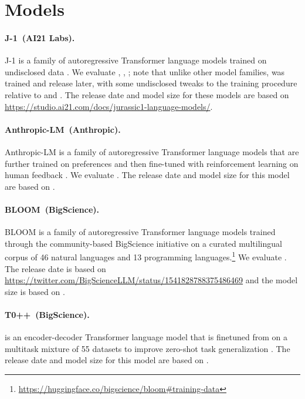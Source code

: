 \section{Models}
\label{app:models}

\paragraph{J-1~(AI21 Labs).} 
J-1 is a family of autoregressive Transformer language models trained on undisclosed data \citep{lieber2021jurassic}. 
We evaluate \jurassiclarge, \jurassicgrande, \jurassicjumbo; note that unlike other model families, \jurassicgrande was trained and release later, with some undisclosed tweaks to the training procedure relative to \jurassiclarge and \jurassicgrande.
The release date and model size for these models are based on \url{https://studio.ai21.com/docs/jurassic1-language-models/}.

\paragraph{Anthropic-LM~(Anthropic).}
Anthropic-LM  is a family of autoregressive Transformer language models \citep{askell2021general} that are further trained on preferences and then fine-tuned with reinforcement learning on human feedback \citep{bai2022helpful}.
We evaluate \anthropic.
The release date and model size for this model are based on \citet{bai2022helpful}.

\paragraph{BLOOM~(BigScience).}
BLOOM \citep{scao2022bloom} is a family of autoregressive Transformer language models trained through the community-based BigScience initiative on a curated multilingual corpus of 46 natural languages and 13 programming languages.\footnote{\url{https://huggingface.co/bigscience/bloom\#training-data}}
We evaluate \bloom. 
The release date is based on \url{https://twitter.com/BigScienceLLM/status/1541828788375486469} and the model size is based on \citet{scao2022bloom}.

\paragraph{T0++~(BigScience).}
\tzero is an encoder-decoder Transformer language model that is finetuned from \tfive on a multitask mixture of 55 datasets to improve zero-shot task generalization \citep{sanh2021multitask}. 
The release date and model size for this model are based on \citet{sanh2021multitask}.

